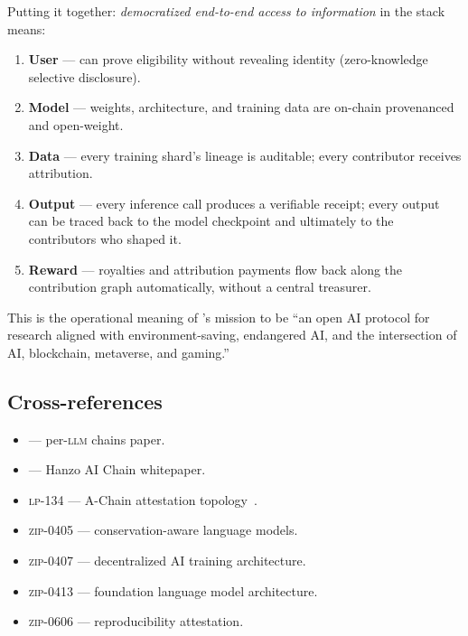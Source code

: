 Putting it together: \emph{democratized end-to-end access to information}
in the \Zoo{} stack means:

\begin{enumerate}[nosep,leftmargin=1.4em]
\item \textbf{User} --- can prove eligibility without revealing
  identity (zero-knowledge selective disclosure).
\item \textbf{Model} --- weights, architecture, and training data are
  on-chain provenanced and open-weight.
\item \textbf{Data} --- every training shard's lineage is auditable;
  every contributor receives attribution.
\item \textbf{Output} --- every inference call produces a verifiable
  receipt; every output can be traced back to the model checkpoint and
  ultimately to the contributors who shaped it.
\item \textbf{Reward} --- royalties and attribution payments flow back
  along the contribution graph automatically, without a central
  treasurer.
\end{enumerate}

This is the operational meaning of \Zoo{}'s mission to be ``an open AI
protocol for research aligned with environment-saving, endangered AI,
and the intersection of AI, blockchain, metaverse, and gaming.''

\subsection{Cross-references}

\begin{itemize}[nosep,leftmargin=1.2em]
\item \cite{zoo-per-llm-chains} --- per-\textsc{llm} chains paper.
\item \cite{hanzo-ai-chain} --- Hanzo AI Chain whitepaper.
\item \Lux{} \textsc{lp-134} --- A-Chain attestation
  topology~\cite{lp-134-topology}.
\item \textsc{zip-0405} --- conservation-aware language models.
\item \textsc{zip-0407} --- decentralized AI training architecture.
\item \textsc{zip-0413} --- foundation language model architecture.
\item \textsc{zip-0606} --- reproducibility attestation.
\end{itemize}
